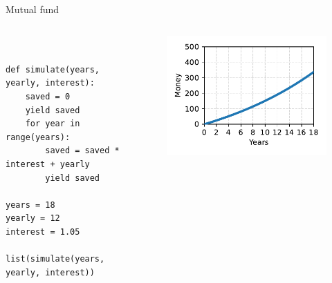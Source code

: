 \documentclass[12pt, aspectratio=149]{beamer}
\theoremstyle{plain}
\begin{document}
\begin{frame}[fragile]{Mutual fund}
\begin{columns}
\begin{column}{0.55\textwidth}
    \begin{center}
     \begin{verbatim} 


def simulate(years, yearly, interest):
    saved = 0
    yield saved
    for year in range(years):
        saved = saved * interest + yearly
        yield saved
        
years = 18
yearly = 12
interest = 1.05

list(simulate(years, yearly, interest))
     \end{verbatim}
     \end{center}
\end{column}
\begin{column}{0.45\textwidth}  %
    \begin{center}
     \begin{figure}
     	\centering
     	\includegraphics[width=0.99\linewidth]{figures/mutual_fund}
     \end{figure}
     \end{center}
\end{column}
\end{columns}
\end{frame}
\end{document}
